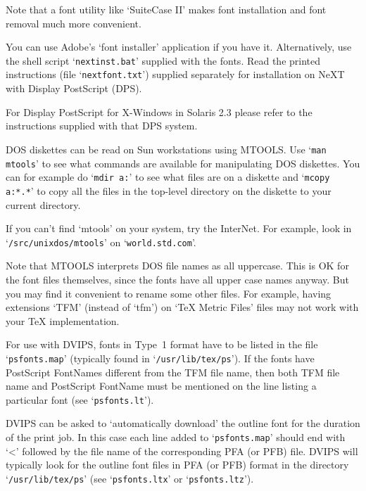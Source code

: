 Note that a font utility like `SuiteCase II' makes font installation
and font removal much more convenient.


You can use Adobe's `font installer' application if you have it.
Alternatively, use the shell script `{\tt nextinst.bat}' supplied with the fonts.
Read the printed instructions (file `{\tt nextfont.txt}')
supplied separately for installation
on NeXT with Display PostScript (DPS).

For Display PostScript for X-Windows in Solaris 2.3 please
refer to the instructions supplied with that DPS system.

DOS diskettes can be read on Sun workstations using MTOOLS.
Use  `{\tt man mtools}'
to see what commands are available for manipulating DOS diskettes.
You can for example do `{\tt mdir a:}' to see what files are on a diskette
and `{\tt mcopy a:*.*}' to copy all the files in the top-level directory
on the diskette to your current directory.

If you can't find `mtools' on your system, try the InterNet.
For example, look in `{\tt /src/unixdos/mtools}' on `{\tt world.std.com}'.

Note that MTOOLS interprets DOS file names as all uppercase.  This is OK
for the font files themselves, since the fonts have all upper case names
anyway.  But you may find it convenient to rename some other files.
For example, having extensions `TFM' (instead of `tfm') on `TeX Metric Files'
files may not work with your {\TeX} implementation.

For use with DVIPS, fonts in Type~1 format have to be listed in the
file `{\tt psfonts.map}' (typically found in `{\tt /usr/lib/tex/ps}'). If the
fonts have PostScript FontNames different from the TFM file name,
then both TFM file name and PostScript FontName must be mentioned on
the line listing a particular font (see `{\tt psfonts.lt}').

DVIPS can be asked to `automatically download' the outline font for
the duration of the print job.  In this case each line added to
`{\tt psfonts.map}' should end with `<' followed by the file name of the
corresponding PFA (or PFB) file.  DVIPS will typically look for the
outline font files in PFA (or PFB) format in the directory
`{\tt /usr/lib/tex/ps}'  (see `{\tt psfonts.ltx}' or `{\tt psfonts.ltz}').


